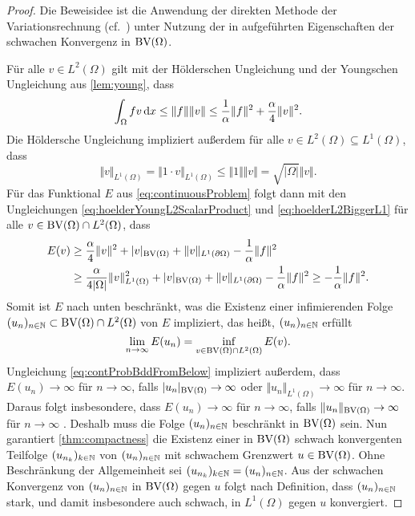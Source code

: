 \begin{proof}
  Die Beweisidee ist die Anwendung der direkten Methode der Variationsrechnung
  (cf.\ \cite{Dac89}) unter Nutzung der in 
  aufgeführten Eigenschaften der schwachen Konvergenz in $\textup{BV}(\Omega)$.

  Für alle $v\in L^2(\Omega)$ gilt mit der Hölderschen
  Ungleichung und der Youngschen Ungleichung aus \cref{lem:young}, dass
  \begin{equation}
    \label{eq:hoelderYoungL2ScalarProduct}
    \int_\Omega fv\,\mathrm{d}x
    \leq 
    \Vert f\Vert\Vert v\Vert
    \leq 
    \frac{1}{\alpha}\Vert f\Vert^2 + \frac{\alpha}{4}\Vert v\Vert^2.
  \end{equation}
  Die Höldersche Ungleichung impliziert außerdem für alle $v\in
  L^2(\Omega)\subseteq L^1(\Omega)$, dass
  \begin{equation}\label{eq:hoelderL2BiggerL1}
    \Vert v\Vert_{L^1(\Omega)} 
    = \Vert 1\cdot v\Vert_{L^1(\Omega)}
    \leq \Vert 1\Vert\Vert v\Vert
    =\sqrt{|\Omega|} \Vert v\Vert.
  \end{equation}
  Für das Funktional $E$ aus \eqref{eq:continuousProblem} folgt dann mit den
  Ungleichungen \eqref{eq:hoelderYoungL2ScalarProduct} und
  \eqref{eq:hoelderL2BiggerL1} für alle $v\in \textup{BV}(\Omega)\cap L^2(\Omega)$,
  dass
  \begin{equation}
    \label{eq:contProbBddFromBelow}
    \begin{aligned}
      E(v)
      &\geq 
      \frac{\alpha}{4}\Vert v\Vert^2 + |v|_{\textup{BV}(\Omega)}
      +\Vert v\Vert_{L^1(\partial\Omega)}-\frac{1}{\alpha}\Vert
      f\Vert^2\\
      &\geq 
      \frac{\alpha}{4|\Omega|}\Vert v\Vert_{L^1(\Omega)}^2 + |v|_{\textup{BV}(\Omega)}
      +\Vert v\Vert_{L^1(\partial\Omega)}-\frac{1}{\alpha}\Vert
      f\Vert^2
      \geq -\frac{1}{\alpha}\Vert f\Vert^2.
    \end{aligned}
  \end{equation}
  Somit ist $E$ nach unten beschränkt, was die Existenz einer infimierenden
  Folge $(u_n)_{n\in\mathbb{N}}\subset\textup{BV}(\Omega)\cap L^2(\Omega)$ von $E$ 
  impliziert, das heißt,
  $(u_n)_{n\in\mathbb{N}}$ erfüllt $$\lim_{n\rightarrow\infty}E(u_n) =
  \inf_{v\in\textup{BV}(\Omega)\cap L^2(\Omega)}E(v).$$ 
  Ungleichung \eqref{eq:contProbBddFromBelow} impliziert außerdem, dass
  $E(u_n)\to\infty$ für $n\to\infty$, falls $|u_n|_{\textup{BV}(\Omega)}\to\infty$ oder
  $\Vert u_n\Vert_{L^1(\Omega)}\to\infty$ für $n\to\infty$. 
  Daraus folgt insbesondere, dass $E(u_n)\to\infty$ für $n\to\infty$, falls
  $\Vert u_n\Vert_{\textup{BV}(\Omega)}\to\infty$ für $n\to\infty$ .
  Deshalb muss die Folge $(u_n)_{n\in\mathbb{N}}$ beschränkt in $\textup{BV}(\Omega)$ sein.
  Nun garantiert \cref{thm:compactness} die Existenz einer in $\textup{BV}(\Omega)$
  schwach konvergenten Teilfolge $(u_{n_k})_{k\in\mathbb{N}}$ von $(u_n)_{n\in\mathbb{N}}$
  mit schwachem Grenzwert $u\in\textup{BV}(\Omega)$. 
  Ohne Beschränkung der Allgemeinheit sei
  $(u_{n_k})_{k\in\mathbb{N}}=(u_n)_{n\in\mathbb{N}}$.
  Aus der schwachen Konvergenz von $(u_n)_{n\in\mathbb{N}}$ in $\textup{BV}(\Omega)$ gegen
  $u$ folgt nach Definition, dass $(u_n)_{n\in\mathbb{N}}$ stark, und damit
  insbesondere auch schwach, in $L^1(\Omega)$ gegen $u$ konvergiert.


\end{proof}
